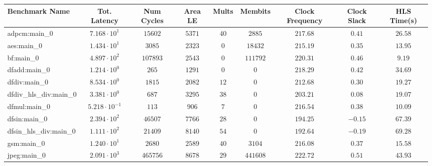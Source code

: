 \begin{tabular}{|l|c|c|c|c|c|c|c|c|}
\hline
Benchmark Name          & Tot. Latency            & Num Cycles & Area LE   & Mults   & Membits    & Clock Frequency & Clock Slack & HLS Time(s) \\
\hline
adpcm:main\_0           & $ 7.168 \cdot 10^{1}  $ & $ 15602  $ & $ 5371  $ & $ 40  $ & $ 2885   $ & $ 217.68      $ & $ 0.41    $ & $ 26.58   $ \\
aes:main\_0             & $ 1.434 \cdot 10^{1}  $ & $ 3085   $ & $ 2323  $ & $ 0   $ & $ 18432  $ & $ 215.19      $ & $ 0.35    $ & $ 13.95   $ \\
bf:main\_0              & $ 4.897 \cdot 10^{2}  $ & $ 107893 $ & $ 2543  $ & $ 0   $ & $ 111792 $ & $ 220.31      $ & $ 0.46    $ & $ 9.19    $ \\
dfadd:main\_0           & $ 1.214 \cdot 10^{0}  $ & $ 265    $ & $ 1291  $ & $ 0   $ & $ 0      $ & $ 218.29      $ & $ 0.42    $ & $ 34.69   $ \\
dfdiv:main\_0           & $ 8.534 \cdot 10^{0}  $ & $ 1815   $ & $ 2082  $ & $ 12  $ & $ 0      $ & $ 212.68      $ & $ 0.30    $ & $ 19.27   $ \\
dfdiv\_hls\_div:main\_0 & $ 3.381 \cdot 10^{0}  $ & $ 687    $ & $ 3295  $ & $ 38  $ & $ 0      $ & $ 203.21      $ & $ 0.08    $ & $ 19.07   $ \\
dfmul:main\_0           & $ 5.218 \cdot 10^{-1} $ & $ 113    $ & $ 906   $ & $ 7   $ & $ 0      $ & $ 216.54      $ & $ 0.38    $ & $ 10.09   $ \\
dfsin:main\_0           & $ 2.394 \cdot 10^{2}  $ & $ 46507  $ & $ 7766  $ & $ 28  $ & $ 0      $ & $ 194.25      $ & $ -0.15   $ & $ 67.39   $ \\
dfsin\_hls\_div:main\_0 & $ 1.111 \cdot 10^{2}  $ & $ 21409  $ & $ 8140  $ & $ 54  $ & $ 0      $ & $ 192.64      $ & $ -0.19   $ & $ 69.28   $ \\
gsm:main\_0             & $ 1.240 \cdot 10^{1}  $ & $ 2680   $ & $ 2589  $ & $ 40  $ & $ 3104   $ & $ 216.08      $ & $ 0.37    $ & $ 15.58   $ \\
jpeg:main\_0            & $ 2.091 \cdot 10^{3}  $ & $ 465756 $ & $ 8678  $ & $ 29  $ & $ 441608 $ & $ 222.72      $ & $ 0.51    $ & $ 43.93   $ \\

\end{tabular}
